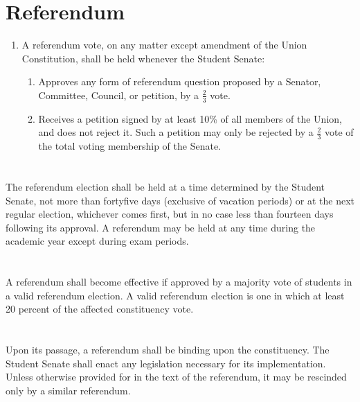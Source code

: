 \section{Referendum}
\begin{enumerate}
\item A referendum vote, on any matter except amendment of the Union Constitution, shall be held
whenever the Student Senate:
\begin{enumerate}
\item Approves any form of referendum question proposed by a Senator, Committee, Council,
or petition, by a $\frac{2}{3}$ vote.
\item Receives a petition signed by at least 10\% of all members of the Union, and does not
reject it. Such a petition may only be rejected by a $\frac{2}{3}$ vote of the total voting
membership of the Senate.
\end{enumerate}
\end{enumerate}

\section{}
The referendum election shall be held at a time determined by the Student Senate, not more than fortyfive
days (exclusive of vacation periods) or at the next regular election, whichever comes first, but in no
case less than fourteen days following its approval. A referendum may be held at any time during the
academic year except during exam periods.

\section{}
A referendum shall become effective if approved by a majority vote of students in a valid referendum
election. A valid referendum election is one in which at least 20 percent of the affected constituency
vote.

\section{}
Upon its passage, a referendum shall be binding upon the constituency. The Student Senate shall enact
any legislation necessary for its implementation. Unless otherwise provided for in the text of the
referendum, it may be rescinded only by a similar referendum. 